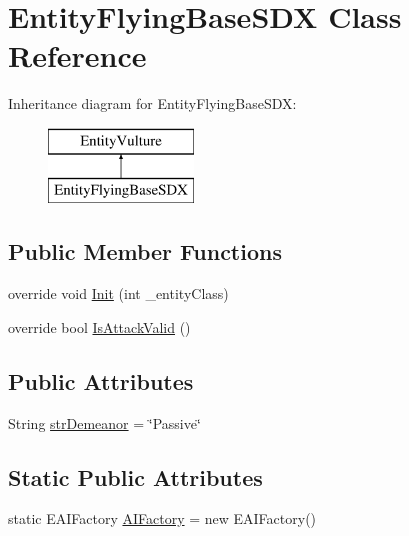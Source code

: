 \hypertarget{class_entity_flying_base_s_d_x}{}\section{Entity\+Flying\+Base\+S\+DX Class Reference}
\label{class_entity_flying_base_s_d_x}
Inheritance diagram for Entity\+Flying\+Base\+S\+DX\+:\begin{figure}[H]
\begin{center}
\leavevmode
\includegraphics[height=2.000000cm]{d7/de7/class_entity_flying_base_s_d_x}
\end{center}
\end{figure}
\subsection*{Public Member Functions}
\begin{DoxyCompactItemize}
\item 
override void \mbox{\hyperlink{class_entity_flying_base_s_d_x_a4d523276acced698e348d07b6761535e}{Init}} (int \+\_\+entity\+Class)
\item 
override bool \mbox{\hyperlink{class_entity_flying_base_s_d_x_a2208d036acaab6140efce0eb7774401a}{Is\+Attack\+Valid}} ()
\end{DoxyCompactItemize}
\subsection*{Public Attributes}
\begin{DoxyCompactItemize}
\item 
String \mbox{\hyperlink{class_entity_flying_base_s_d_x_a2f082afb7876cd6cb28888971cbc9e2d}{str\+Demeanor}} = \char`\"{}Passive\char`\"{}
\end{DoxyCompactItemize}
\subsection*{Static Public Attributes}
\begin{DoxyCompactItemize}
\item 
static E\+A\+I\+Factory \mbox{\hyperlink{class_entity_flying_base_s_d_x_a6090bff9248f106e95097b0ab526b60b}{A\+I\+Factory}} = new E\+A\+I\+Factory()
\end{DoxyCompactItemize}


